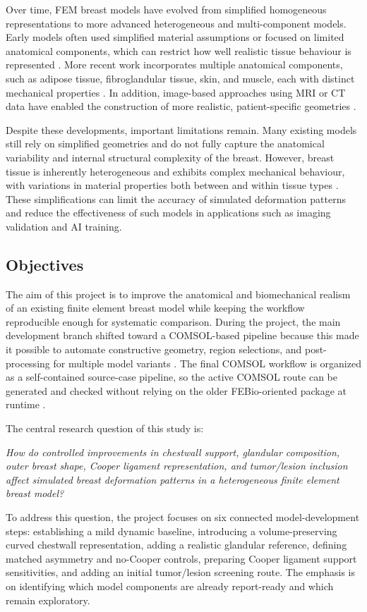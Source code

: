 Over time, FEM breast models have evolved from simplified homogeneous representations to more advanced heterogeneous and multi-component models. Early models often used simplified material assumptions or focused on limited anatomical components, which can restrict how well realistic tissue behaviour is represented \cite{Samani2001, Rajagopal2006, Ruggiero2014}. More recent work incorporates multiple anatomical components, such as adipose tissue, fibroglandular tissue, skin, and muscle, each with distinct mechanical properties \cite{Chen2024, Mazier2024}. In addition, image-based approaches using MRI or CT data have enabled the construction of more realistic, patient-specific geometries \cite{Hsu2011, Sturgeon2016}.

Despite these developments, important limitations remain. Many existing models still rely on simplified geometries and do not fully capture the anatomical variability and internal structural complexity of the breast. However, breast tissue is inherently heterogeneous and exhibits complex mechanical behaviour, with variations in material properties both between and within tissue types \cite{Ramiao2016, Goodbrake2022, Galbreath2025}. These simplifications can limit the accuracy of simulated deformation patterns and reduce the effectiveness of such models in applications such as imaging validation and AI training.

\subsection{Objectives}

The aim of this project is to improve the anatomical and biomechanical realism of an existing finite element breast model while keeping the workflow reproducible enough for systematic comparison. During the project, the main development branch shifted toward a COMSOL-based pipeline because this made it possible to automate constructive geometry, region selections, and post-processing for multiple model variants \cite{COMSOLMultiphysicsWebsite}. The final COMSOL workflow is organized as a self-contained source-case pipeline, so the active COMSOL route can be generated and checked without relying on the older FEBio-oriented package at runtime \cite{FEBioWebsite}.

The central research question of this study is:

\textit{How do controlled improvements in chestwall support, glandular composition, outer breast shape, Cooper ligament representation, and tumor/lesion inclusion affect simulated breast deformation patterns in a heterogeneous finite element breast model?}

To address this question, the project focuses on six connected model-development steps: establishing a mild dynamic baseline, introducing a volume-preserving curved chestwall representation, adding a realistic glandular reference, defining matched asymmetry and no-Cooper controls, preparing Cooper ligament support sensitivities, and adding an initial tumor/lesion screening route. The emphasis is on identifying which model components are already report-ready and which remain exploratory.
